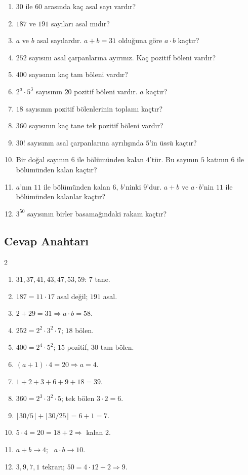 \begin{enumerate}[label=\textbf{\arabic*.},leftmargin=*,itemsep=6pt]
\item \(30\) ile \(60\) arasında kaç asal sayı vardır?
\item \(187\) ve \(191\) sayıları asal mıdır?
\item \(a\) ve \(b\) asal sayılardır. \(a+b=31\) olduğuna göre \(a\cdot b\) kaçtır?
\item \(252\) sayısını asal çarpanlarına ayırınız. Kaç pozitif böleni vardır?
\item \(400\) sayısının kaç tam böleni vardır?
\item \(2^a\cdot 5^3\) sayısının \(20\) pozitif böleni vardır. \(a\) kaçtır?
\item \(18\) sayısının pozitif bölenlerinin toplamı kaçtır?
\item \(360\) sayısının kaç tane tek pozitif böleni vardır?
\item \(30!\) sayısının asal çarpanlarına ayrılışında \(5\)'in üssü kaçtır?
\item Bir doğal sayının \(6\) ile bölümünden kalan \(4\)'tür. Bu sayının \(5\) katının \(6\) ile bölümünden kalan kaçtır?
\item \(a\)'nın \(11\) ile bölümünden kalan \(6\), \(b\)'ninki \(9\)'dur. \(a+b\) ve \(a\cdot b\)'nin \(11\) ile bölümünden kalanlar kaçtır?
\item \(3^{50}\) sayısının birler basamağındaki rakam kaçtır?
\end{enumerate}

\subsection*{Cevap Anahtarı}
{\small
\begin{multicols}{2}
\begin{enumerate}[label=\textbf{\arabic*.},leftmargin=*,itemsep=1pt]
\item \(31,37,41,43,47,53,59\): \(7\) tane.
\item \(187=11\cdot 17\) asal değil; \(191\) asal.
\item \(2+29=31\Rightarrow a\cdot b=58\).
\item \(252=2^2\cdot 3^2\cdot 7\); \(18\) bölen.
\item \(400=2^4\cdot 5^2\); \(15\) pozitif, \(30\) tam bölen.
\item \((a+1)\cdot 4=20\Rightarrow a=4\).
\item \(1+2+3+6+9+18=39\).
\item \(360=2^3\cdot 3^2\cdot 5\); tek bölen \(3\cdot 2=6\).
\item \(\lfloor 30/5\rfloor+\lfloor 30/25\rfloor=6+1=7\).
\item \(5\cdot 4=20=18+2\Rightarrow\) kalan \(2\).
\item \(a+b\to 4\); \ \(a\cdot b\to 10\).
\item \(3,9,7,1\) tekrarı; \(50=4\cdot 12+2\Rightarrow 9\).
\end{enumerate}
\end{multicols}}
